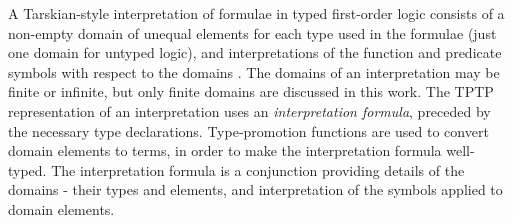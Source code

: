 \documentclass[letterpaper]{article}
\newcommand{\smalltt}[1]{\small \texttt{#1}}
\newenvironment{packed_itemize}{
\vspace*{-0.2em}
\begin{itemize}
\setlength{\partopsep}{0pt}
\setlength{\itemsep}{1pt}
\setlength{\parskip}{0pt}
\setlength{\parsep}{0pt}
}{\end{itemize}}
\begin{document}
A Tarskian-style interpretation \cite{TV56} of formulae in typed first-order logic consists of a 
non-empty domain of unequal elements for each type used in the formulae (just one domain for 
untyped logic), and interpretations of the function and predicate symbols with respect to the 
domains \cite{Hun96}.
The domains of an interpretation may be finite or infinite, but only finite domains are discussed
in this work.
The TPTP representation of an interpretation uses an {\em interpretation formula}, preceded by 
the necessary type declarations.
Type-promotion functions are used to convert domain elements to terms, in order to make the
interpretation formula well-typed.
The interpretation formula is a conjunction providing details of the domains -
their types and elements, and interpretation of the symbols applied to domain elements.
\end{document}

